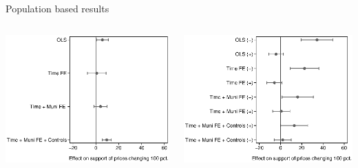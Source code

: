 \documentclass[aspectratio=169]{beamer}
\begin{document}
\begin{frame}{Population based results}
	\begin{columns}
		\includegraphics[width=1\textwidth]{../../figures/pooled_effects.eps} 
		


    \pause
		\includegraphics[width=1\textwidth]{../../figures/posneg_effects.eps}
		\end{columns} 		\pause
		
\end{frame}	
\end{document}
